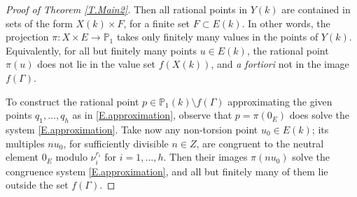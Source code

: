 \documentclass[10pt,a4paper]{amsart}
\def\P{{{\mathbb P}}}
\begin{document}
\begin{proof}[ Proof of Theorem \ref{T.Main2}]
Then all rational points in $Y(k)$ are contained in sets of the form $X(k)\times F$, for a finite set $F\subset E(k)$. In other words, the projection $\pi: X\times E \to \P_1$ takes only finitely many values in the points of $Y(k)$. Equivalently, for all but finitely many points $u\in E(k)$, the rational point $\pi(u)$ does not lie in the value set $f(X(k))$, and {\it a fortiori} not in the image $f(\Gamma)$. 

To construct the rational point $p\in \P_1(k)\setminus f(\Gamma)$ approximating the given points $q_1,\ldots,q_h$ as in \eqref{E.approximation}, observe that $p=\pi(0_E)$ does solve the system \eqref{E.approximation}. Take now any non-torsion point $u_0\in E(k)$; its multiples $nu_0$, for sufficiently divisible $n\in Z$, are congruent to the neutral element $0_E$ modulo $\nu_i^{r_i}$ for $i=1,\ldots,h$. Then their images $\pi(nu_0)$ solve the congruence system \eqref{E.approximation}, and all but finitely many of them lie outside the set $f(\Gamma)$.

\end{proof}
\end{document}
